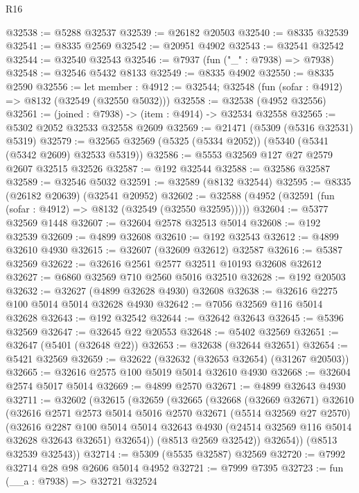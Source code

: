 \begin{lexlean}{R16}
\begin{coremodule}
@32538 := @5288 @32537
@32539 := @26182 @20503
@32540 := @8335 @32539
@32541 := @8335 @2569
@32542 := @20951 @4902
@32543 := @32541 @32542
@32544 := @32540 @32543
@32546 := @7937 (fun ("_" : @7938) => @7938)
@32548 := @32546 @5432 @8133
@32549 := @8335 @4902
@32550 := @8335 @2590
@32556 := let member : @4912 := @32544;
  @32548 (fun (sofar : @4912) => @8132 (@32549 (@32550 @5032)))
@32558 := @32538 (@4952 @32556)
@32561 := (joined : @7938) -> (item : @4914) -> @32534 @32558
@32565 := @5302 @2052 @32533 @32558 @2609
@32569 := @21471 (@5309 (@5316 @32531) @5319)
@32579 := @32565 @32569 (@5325 (@5334 @2052)) (@5340 (@5341 (@5342 @2609) @32533 @5319))
@32586 := @5553 @32569 @127 @27 @2579 @2607 @32515 @32526
@32587 := @192 @32544
@32588 := @32586 @32587
@32589 := @32546 @5032
@32591 := @32589 (@8132 @32544)
@32595 := @8335 (@26182 @20639) (@32541 @20952)
@32602 := @32588 (@4952 (@32591 (fun (sofar : @4912) => @8132 (@32549 (@32550 @32595)))))
@32604 := @5377 @32569 @1448
@32607 := @32604 @2578 @32513 @5014
@32608 := @192 @32539
@32609 := @4899 @32608
@32610 := @192 @32543
@32612 := @4899 @32610 @4930
@32615 := @32607 (@32609 @32612) @32587
@32616 := @5387 @32569
@32622 := @32616 @2561 @2577 @32511 @10193 @32608 @32612
@32627 := @6860 @32569 @710 @2560 @5016 @32510
@32628 := @192 @20503
@32632 := @32627 (@4899 @32628 @4930) @32608
@32638 := @32616 @2275 @100 @5014 @5014 @32628 @4930
@32642 := @7056 @32569 @116 @5014 @32628
@32643 := @192 @32542
@32644 := @32642 @32643
@32645 := @5396 @32569
@32647 := @32645 @22 @20553
@32648 := @5402 @32569
@32651 := @32647 (@5401 (@32648 @22))
@32653 := @32638 (@32644 @32651)
@32654 := @5421 @32569
@32659 := @32622 (@32632 (@32653 @32654) (@31267 @20503))
@32665 := @32616 @2575 @100 @5019 @5014 @32610 @4930
@32668 := @32604 @2574 @5017 @5014
@32669 := @4899 @2570
@32671 := @4899 @32643 @4930
@32711 := @32602
    (@32615
      (@32659
        (@32665
          (@32668
            (@32669 @32671)
            @32610
            (@32616
              @2571
              @2573
              @5014
              @5016
              @2570
              @32671
              (@5514 @32569 @27 @2570)
              (@32616
                @2287
                @100
                @5014
                @5014
                @32643
                @4930
                (@24514 @32569 @116 @5014 @32628 @32643 @32651)
                @32654))
            (@8513 @2569 @32542))
          @32654))
      (@8513 @32539 @32543))
@32714 := @5309 (@5535 @32587) @32569
@32720 := @7992 @32714 @28 @98 @2606 @5014 @4952
@32721 := @7999 @7395
@32723 := fun (__a : @7938) => @32721 @32524

\end{coremodule}
\end{lexlean}

